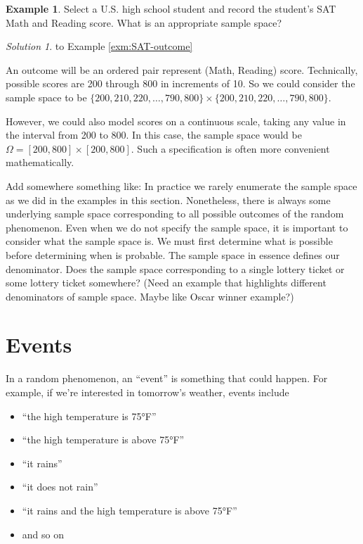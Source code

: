 \documentclass[
]{book}
\providecommand{\tightlist}{%
  \setlength{\itemsep}{0pt}\setlength{\parskip}{0pt}}
\theoremstyle{definition}
\theoremstyle{definition}
\newtheorem{example}{Example}[chapter]
\theoremstyle{definition}
\theoremstyle{remark}
\newtheorem*{solution}{Solution}
\begin{document}
\begin{example}
\protect\hypertarget{exm:SAT-outcome}{}{\label{exm:SAT-outcome} }Select a U.S. high school student and record the student's SAT Math and Reading score. What is an appropriate sample space?
\end{example}

\begin{solution}
{}to Example \ref{exm:SAT-outcome}
\end{solution}

An outcome will be an ordered pair represent (Math, Reading) score. Technically, possible scores are 200 through 800 in increments of 10. So we could consider the sample space to be \(\{200, 210, 220, \ldots, 790, 800\}\times \{200, 210, 220, \ldots, 790, 800\}\).

However, we could also model scores on a continuous scale, taking any value in the interval from 200 to 800. In this case, the sample space would be \(\Omega = [200, 800] \times [200, 800]\). Such a specification is often more convenient mathematically.

Add somewhere something like: In practice we rarely enumerate the sample space as we did in the examples in this section. Nonetheless, there is always some underlying sample space corresponding to all possible outcomes of the random phenomenon. Even when we do not specify the sample space, it is important to consider what the sample space is. We must first determine what is possible before determining when is probable. The sample space in essence defines our denominator. Does the sample space corresponding to a single lottery ticket or some lottery ticket somewhere? (Need an example that highlights different denominators of sample space. Maybe like Oscar winner example?)

\hypertarget{events}{%
\section{Events}\label{events}}

In a random phenomenon, an ``event'' is something that could happen. For example, if we're interested in tomorrow's weather, events include

\begin{itemize}
\tightlist
\item
  ``the high temperature is 75°F''
\item
  ``the high temperature is above 75°F''
\item
  ``it rains''
\item
  ``it does not rain''
\item
  ``it rains and the high temperature is above 75°F''
\item
  and so on
\end{itemize}
\end{document}
